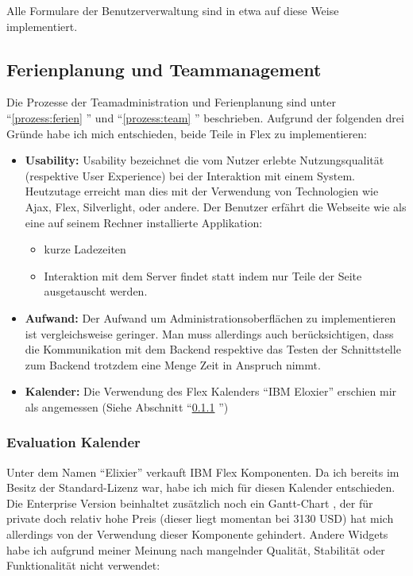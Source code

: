 Alle Formulare der Benutzerverwaltung sind in etwa auf diese Weise implementiert. 


 
\subsection{Ferienplanung und Teammanagement}\label{implementation:ferienplanung}
Die Prozesse der Teamadministration und Ferienplanung sind unter ``\ref{prozess:ferien} '' und  ``\ref{prozess:team} '' beschrieben. Aufgrund der folgenden drei Gr\"unde habe ich mich entschieden, beide Teile in Flex zu implementieren:
\begin{itemize}
\item \textbf{Usability: } Usability bezeichnet die vom Nutzer erlebte Nutzungsqualit\"at (respektive User Experience) bei der Interaktion mit einem System\cite{wiki:usability}. Heutzutage erreicht man dies mit der Verwendung von Technologien wie Ajax, Flex, Silverlight, oder andere. Der Benutzer erf\"ahrt die Webseite wie als eine auf seinem Rechner installierte Applikation:
\begin{itemize}
\item kurze Ladezeiten
\item Interaktion mit dem Server findet statt indem nur Teile der Seite ausgetauscht werden.
\end{itemize}
\item \textbf{Aufwand: }Der Aufwand um Administrationsoberfl\"achen zu implementieren ist vergleichsweise geringer. Man muss allerdings auch ber\"ucksichtigen, dass die Kommunikation mit dem Backend respektive das Testen der Schnittstelle zum Backend trotzdem eine Menge Zeit in Anspruch nimmt.
\item \textbf{Kalender: } Die Verwendung des Flex Kalenders ``IBM Eloxier'' erschien mir als angemessen (Siehe Abschnitt ``\ref{evaluation:kalender} '')
\end{itemize}

\subsubsection{Evaluation Kalender}\label{evaluation:kalender}
Unter dem Namen ``Elixier'' verkauft IBM Flex Komponenten. Da ich bereits im Besitz der Standard-Lizenz war, habe ich mich f\"ur diesen Kalender entschieden. Die Enterprise Version beinhaltet zus\"atzlich noch ein Gantt-Chart \cite{wiki:gantt}, der f\"ur private doch relativ hohe Preis (dieser liegt momentan bei 3130 USD) hat mich allerdings von der Verwendung dieser Komponente gehindert.  Andere Widgets habe ich aufgrund meiner Meinung nach mangelnder Qualit\"at, Stabilit\"at oder Funktionalit\"at nicht verwendet:


